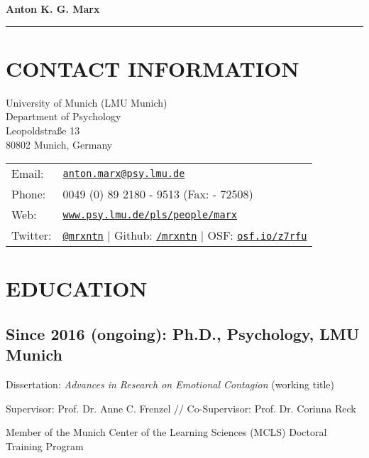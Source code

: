 \documentclass[letterpaper]{article}
\def\name{Anton K. G. Marx} %
\renewenvironment{itemize}{ %
  \begin{list}{}{ %
    \setlength{\leftmargin}{2.5em} %
  }
}{
  \end{list}
}
\begin{document}
\begin{center} %

{\Huge \bf \name}

\end{center}

\noindent\rule{\textwidth}{0.5pt} %

\section*{CONTACT INFORMATION}

\vspace{0in}



\begin{minipage}{0.45\linewidth}
  University of Munich (LMU Munich) \\
  Department of Psychology \\
  Leopoldstraße 13 \\ 
  80802 Munich, Germany
\end{minipage}
\begin{minipage}{1.45\linewidth}
  \begin{tabular}{ll}
    Email: & \href{mailto:anton.marx@psy.lmu.de}{\tt anton.marx@psy.lmu.de} \\
    Phone: & 0049 (0) 89  2180 - 9513 (Fax: - 72508)\\
    Web: & \href{https://www.psy.lmu.de/pls/people/marx/}{\tt www.psy.lmu.de/pls/people/marx} \\
    Twitter: & \href{https://www.twitter.com/mrxntn/}{\tt @mrxntn} | Github: \href{https://www.github.com/mrxntn/}{\tt /mrxntn} | OSF:  \href{https://www.osf.io/z7rfu/}{\tt osf.io/z7rfu}\\
      \end{tabular}
\end{minipage}



\section*{EDUCATION}

\subsection*{Since 2016 (ongoing): Ph.D., Psychology, LMU Munich}
\begin{itemize}
  \item Dissertation: {\it Advances in Research on Emotional Contagion} (working title)
    \item Supervisor: Prof. Dr. Anne C. Frenzel // Co-Supervisor: Prof. Dr. Corinna Reck
    \item Member of the Munich Center of the Learning Sciences (MCLS) Doctoral Training Program
  \end{itemize}
\end{document}
